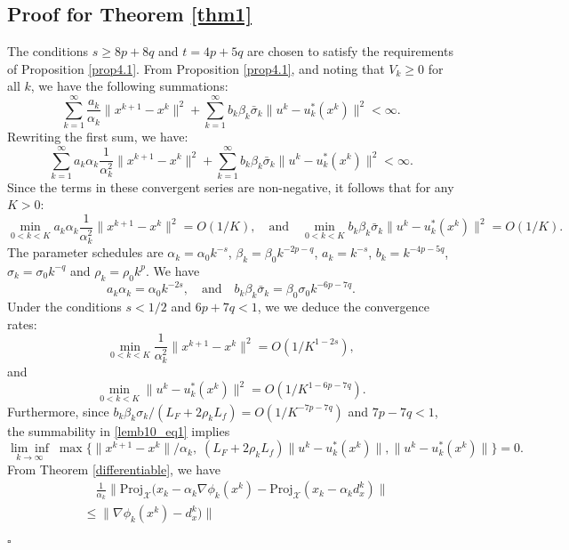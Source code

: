\documentclass{article}
\newenvironment{proof}[1][Proof]{\par
	\normalfont\topsep6pt\relax
	\trivlist\item[\hskip\labelsep\itshape #1.]\ignorespaces
}{%
	\hfill\ensuremath{\square}\endtrivlist
}
\def\x{x}
\begin{document}
\subsection{Proof for Theorem \ref{thm1}}
\begin{proof}[Proof of Theorem \ref{thm1}]
    The conditions $s \ge 8p + 8q$ and $t = 4p + 5q$ are chosen to satisfy the requirements of Proposition \ref{prop4.1}. From Proposition \ref{prop4.1}, and noting that $V_k \ge 0$ for all $k$, we have the following summations:
      \[
      \sum_{k=1}^{\infty}\frac{a_k}{\alpha_k} \|x^{k+1}-x^{k}\|^2 + \sum_{k=1}^{\infty} b_k \beta_k\bar{\sigma}_k \|u^{k}-u_{k}^*(x^{k})\|^2 < \infty.
      \]
Rewriting the first sum, we have:
    \begin{equation}\label{lemb10_eq1}
      \sum_{k=1}^{\infty}a_k \alpha_k \frac{1}{\alpha_k^2}\|x^{k+1}-x^{k}\|^2 + \sum_{k=1}^{\infty} b_k \beta_k\bar{\sigma}_k \|u^{k}-u_{k}^*(x^{k})\|^2 < \infty.
    \end{equation}
Since the terms in these convergent series are non-negative, it follows that for any $K > 0$:
    \[
    \min_{0<k<K} a_k \alpha_k \frac{1}{\alpha_k^2} \| x^{k+1}-x^{k}\|^2 = O(1/K), \quad \text{and} \quad  \min_{0<k<K} b_k \beta_k\bar{\sigma}_k \|u^{k}-u_{k}^*(x^{k})\|^2 = O(1/K).
    \]
    The parameter schedules are $\alpha_k = \alpha_0 k^{-s}$, $\beta_k = \beta_0 k^{-2p-q}$, $a_k = k^{-s}$, $b_k = k^{-4p-5q}$, $\sigma_k = \sigma_0 k^{-q}$ and $\rho_k = \rho_0 k^p$. We have 
    \[
    a_k \alpha_k = \alpha_0 k^{-2s}, \quad \text{and} \quad b_k \beta_k\bar{\sigma}_k = \beta_0 \sigma_0 k^{-6p-7q}.
    \]
    Under the conditions $s < 1/2$ and $6p + 7q < 1$, we we deduce the convergence rates:
    \[
    \min_{0<k<K} \frac{1}{\alpha_k^2} \| x^{k+1}-x^{k}\|^2 = O(1/K^{1-2s}), 
    \]
    and
    \[
    \min_{0<k<K} \|u^{k}-u_{k}^*(x^{k})\|^2 = O(1/K^{1-6p-7q}).
    \]
Furthermore, since $b_k\beta_k\sigma_k/(L_F+2\rho_kL_f)=O(1/K^{-7p-7q})$ and $7p-7q<1$, the summability in \eqref{lemb10_eq1} implies
\[
    \underset{k \rightarrow \infty}{\lim\inf}\;\max\{\|x^{k+1}-x^{k}\|/\alpha_k,\;(L_F+2\rho_kL_f)\| u^{k}-u_{k}^*(x^{k}) \|,\| u^{k}-u_{k}^*(x^{k}) \|\} = 0.
    \]
     From Theorem \ref{differentiable}, we have
    \[
    \begin{aligned}
         &\quad \frac{1}{\alpha_k}\| \mathrm{Proj}_{\mathcal{X}}(\x_k-\alpha_k \nabla\phi_{k}(x^k) -\mathrm{Proj}_{\mathcal{X}}(\x_k-\alpha_k d_{\x}^k)\| \\
         &\le  \|\nabla\phi_{k}(x^k) - d_{\x}^k)\| \\

\end{aligned}\]
\end{proof}
\end{document}
